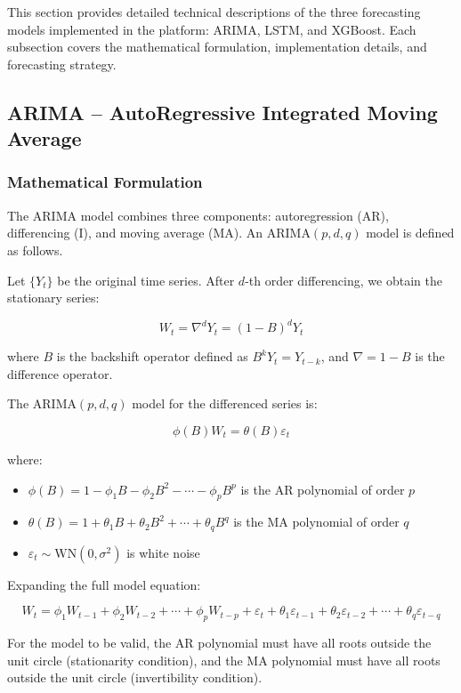 This section provides detailed technical descriptions of the three forecasting models implemented in the platform: ARIMA, LSTM, and XGBoost. Each subsection covers the mathematical formulation, implementation details, and forecasting strategy.

\subsection{ARIMA -- AutoRegressive Integrated Moving Average}
\label{subsec:arima}

\subsubsection{Mathematical Formulation}

The ARIMA model combines three components: autoregression (AR), differencing (I), and moving average (MA). An ARIMA$(p, d, q)$ model is defined as follows.

Let $\{Y_t\}$ be the original time series. After $d$-th order differencing, we obtain the stationary series:

$$W_t = \nabla^d Y_t = (1 - B)^d Y_t$$

where $B$ is the backshift operator defined as $B^k Y_t = Y_{t-k}$, and $\nabla = 1 - B$ is the difference operator.

The ARIMA$(p, d, q)$ model for the differenced series is:

$$\phi(B) W_t = \theta(B) \varepsilon_t$$

where:
\begin{itemize}
    \item $\phi(B) = 1 - \phi_1 B - \phi_2 B^2 - \cdots - \phi_p B^p$ is the AR polynomial of order $p$
    \item $\theta(B) = 1 + \theta_1 B + \theta_2 B^2 + \cdots + \theta_q B^q$ is the MA polynomial of order $q$
    \item $\varepsilon_t \sim \text{WN}(0, \sigma^2)$ is white noise
\end{itemize}

Expanding the full model equation:

$$W_t = \phi_1 W_{t-1} + \phi_2 W_{t-2} + \cdots + \phi_p W_{t-p} + \varepsilon_t + \theta_1 \varepsilon_{t-1} + \theta_2 \varepsilon_{t-2} + \cdots + \theta_q \varepsilon_{t-q}$$

For the model to be valid, the AR polynomial must have all roots outside the unit circle (stationarity condition), and the MA polynomial must have all roots outside the unit circle (invertibility condition).

